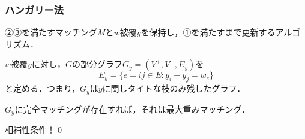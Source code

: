 \documentclass[14pt,aspectratio=169,xcolor=dvipsnames,table,onlytextwidth,dvipdfmx]{beamer}
\begin{document}
\begin{frame}
    \frametitle{ハンガリー法}

    \small
    ②③を満たすマッチング$M$と$w$被覆$y$を保持し，①を満たすまで更新するアルゴリズム．

    \begin{definition}
        $w$被覆$y$に対し，$G$の部分グラフ$G_y = (V^+, V^-, E_y)$を
        \[
            E_y = \{e = ij \in E : y_i + y_j = w_e \} 
        \]
        と定める．つまり，$G_y$は$y$に関しタイトな枝のみ残したグラフ．
    \end{definition}

    \begin{lemma}
        $G_y$に完全マッチングが存在すれば，それは最大重みマッチング．
    \end{lemma}
     相補性条件！\qed

\end{frame}
\end{document}
